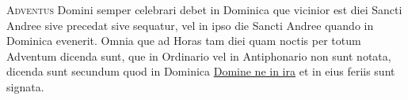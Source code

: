 \begin{multicols*}{2}
{\color{Red} }
\lettrine[lines=2]{\zallmancaps \color{Red} A}{dventus} Domini semper celebrari debet in Dominica que vicinior est diei Sancti Andree sive precedat sive sequatur, vel in ipso die Sancti Andree quando in Dominica evenerit.
Omnia que ad Horas tam diei quam noctis per totum Adventum dicenda sunt, que in Ordinario vel in Antiphonario non sunt notata, dicenda sunt secundum quod in Dominica \hyperlink{domine-ne-in-ira}{Domine ne in ira} et in eius feriis sunt signata.

{\color{Red}}


{\color{Red}}



\end{multicols*}
